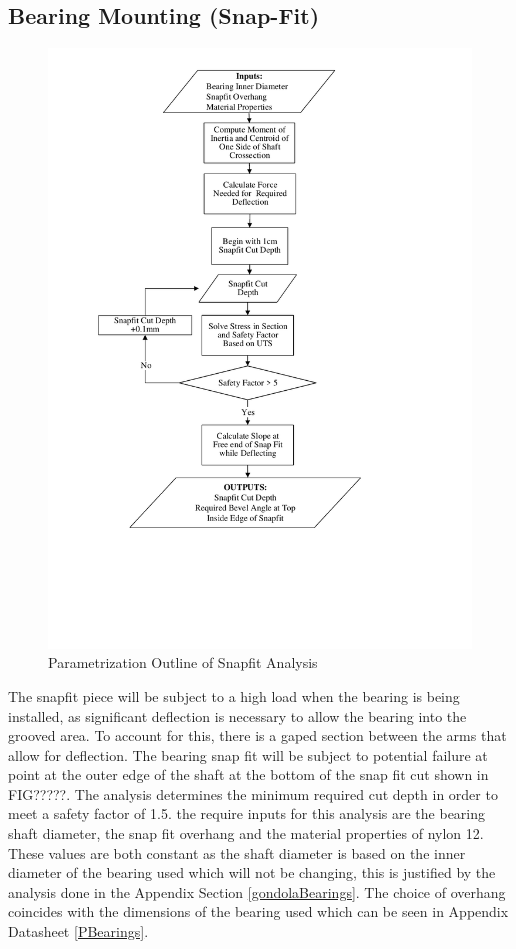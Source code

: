 \documentclass[../main.tex]{subfiles}
\begin{document}
\subsection{Bearing Mounting (Snap-Fit)} \label{snapFit}
\begin{figure}[H]
	\centering
	\includegraphics[width=1 \textwidth]{img/Paramaterization/snapFit.pdf}
	\caption{Parametrization Outline of Snapfit Analysis}
	\label{fig:snapParamaterization}
\end{figure}


The snapfit piece will be subject to a high load when the bearing is being installed, as significant deflection is necessary to allow the bearing into the grooved area. To account for this, there is a gaped section between the arms that allow for deflection. The bearing snap fit will be subject to potential failure at point at the outer edge of the shaft at the bottom of the snap fit cut shown in FIG?????. The analysis determines the minimum required cut depth in order to meet a safety factor of 1.5. the require inputs for this analysis are the bearing shaft diameter, the snap fit overhang and the material properties of nylon 12. These values are both constant as the shaft diameter is based on the inner diameter of the bearing used which will not be changing, this is justified by the analysis done in the Appendix Section \ref{gondolaBearings}. The choice of overhang coincides with the dimensions of the bearing used which can be seen in Appendix Datasheet \ref{PBearings}.\\  
\end{document}
